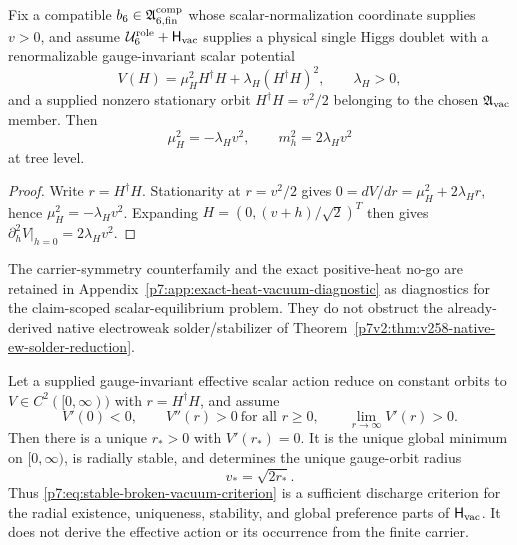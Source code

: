\documentclass[12pt,a4paper]{article}
\newcommand{\Hvac}{\mathsf{H}_{\rm vac}}
\newcommand{\Urole}{\mathcal U_6^{\rm role}}
\newcommand{\Acompsix}{\mathfrak A_{6,{\rm fin}}^{\rm comp}}
\begin{document}
\begin{theorem}
\label{p7v2:thm:conditional-potential}
Fix a compatible \(b_6\in\Acompsix\) whose scalar-normalization coordinate
supplies \(v>0\), and assume \(\Urole+\Hvac\) supplies a physical single
Higgs doublet with a
renormalizable gauge-invariant scalar potential
\begin{equation}
\label{p7v2:eq:higgs-potential}
 V(H)=\mu_H^2H^\dagger H+\lambda_H(H^\dagger H)^2,
 \qquad \lambda_H>0,
\end{equation}
and a supplied nonzero stationary orbit
\(H^\dagger H=v^2/2\) belonging to the chosen \(\mathfrak A_{\rm vac}\)
member.  Then
\begin{equation}
\label{p7v2:eq:conditional-mu}
 \mu_H^2=-\lambda_Hv^2,
 \qquad
 m_h^2=2\lambda_Hv^2
\end{equation}
at tree level.
\end{theorem}

\begin{proof}
Write \(r=H^\dagger H\).  Stationarity at \(r=v^2/2\) gives
\(0=dV/dr=\mu_H^2+2\lambda_Hr\), hence
\(\mu_H^2=-\lambda_Hv^2\).  Expanding
\(H=(0,(v+h)/\sqrt2)^T\) then gives
\(\partial_h^2V|_{h=0}=2\lambda_Hv^2\).
\end{proof}

\begin{remark}
\label{p7v2:rem:v258-scalar-stationary-diagnostics}
The carrier-symmetry counterfamily and the exact positive-heat no-go are
retained in Appendix~\ref{p7:app:exact-heat-vacuum-diagnostic} as diagnostics
for the claim-scoped scalar-equilibrium problem.  They do not obstruct the
already-derived native electroweak solder/stabilizer of
Theorem~\ref{p7v2:thm:v258-native-ew-solder-reduction}.
\end{remark}

\begin{theorem}
\label{p7:thm:sufficient-stable-broken-vacuum}
Let a supplied gauge-invariant effective scalar action reduce on constant
orbits to \(V\in C^2([0,\infty))\) with \(r=H^\dagger H\), and assume
\begin{equation}
 \label{p7:eq:stable-broken-vacuum-criterion}
 V'(0)<0,
 \qquad V''(r)>0\ \text{for all }r\ge0,
 \qquad \lim_{r\to\infty}V'(r)>0.
\end{equation}
Then there is a unique \(r_*>0\) with \(V'(r_*)=0\).  It is the unique
global minimum on \([0,\infty)\), is radially stable, and determines the
unique gauge-orbit radius
\begin{equation}
 \label{p7:eq:stable-broken-vacuum-radius}
 \boxed{v_*=\sqrt{2r_*}.}
\end{equation}
Thus \eqref{p7:eq:stable-broken-vacuum-criterion} is a sufficient discharge
criterion for the radial existence, uniqueness, stability, and global
preference parts of \(\Hvac\).  It does not derive the effective action or
its occurrence from the finite carrier.
\end{theorem}
\end{document}
